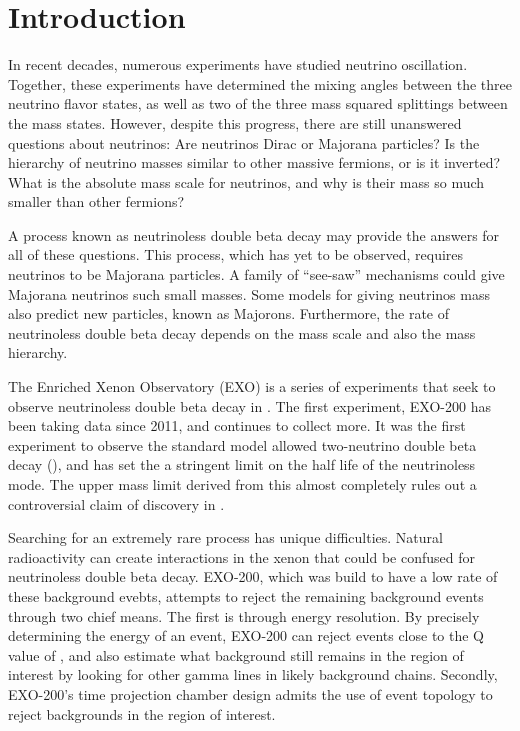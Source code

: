 \documentclass[herrin-thesis.tex]{subfiles}
\begin{document}
\chapter{Introduction}

In recent decades, numerous experiments have studied neutrino oscillation. Together, these experiments have determined the mixing angles between the three neutrino flavor states, as well as two of the three mass squared splittings between the mass states. However, despite this progress, there are still unanswered questions about neutrinos: Are neutrinos Dirac or Majorana particles? Is the hierarchy of neutrino masses similar to other massive fermions, or is it inverted? What is the absolute mass scale for neutrinos, and why is their mass so much smaller than other fermions?

A process known as neutrinoless double beta decay may provide the answers for all of these questions. This process, which has yet to be observed, requires neutrinos to be Majorana particles. A family of ``see-saw'' mechanisms could give Majorana neutrinos such small masses. Some models for giving neutrinos mass also predict new particles, known as Majorons. Furthermore, the rate of neutrinoless double beta decay depends on the mass scale and also the mass hierarchy.

The Enriched Xenon Observatory (EXO) is a series of experiments that seek to observe neutrinoless double beta decay in . The first experiment, EXO-200 has been taking data since 2011, and continues to collect more. It was the first experiment to observe the standard model allowed two-neutrino double beta decay (\twonu)\cite{Ackerman:2011gz}, and has set the a stringent limit on the half life of the neutrinoless mode\cite{Auger:2012ar}. The upper mass limit derived from this almost completely rules out a controversial claim of discovery in .

Searching for an extremely rare process has unique difficulties. Natural radioactivity can create interactions in the xenon that could be confused for neutrinoless double beta decay. EXO-200, which was build to have a low rate of these background evebts, attempts to reject the remaining background events through two chief means. The first is through energy resolution. By precisely determining the energy of an event, EXO-200 can reject events close to the Q value of , and also estimate what background still remains in the region of interest by looking for other gamma lines in likely background chains. Secondly, EXO-200's time projection chamber design admits the use of event topology to reject backgrounds in the region of interest.
\end{document}
